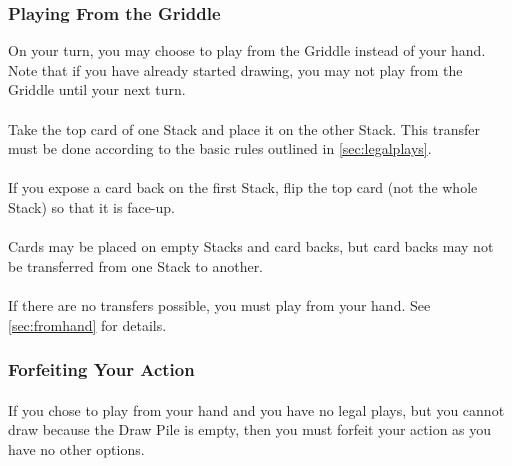 \documentclass{article}
\begin{document}
\subsubsection{Playing From the Griddle \label{sec:fromstack}}

On your turn, you may choose to play from the Griddle instead of your hand. Note that if you have already started drawing, you may not play from the Griddle until your next turn.

\paragraph{\label{par:transfer}}
Take the top card of one Stack and place it on the other Stack. This transfer must be done according to the basic rules outlined in \autoref{sec:legalplays}.

\paragraph{\label{par:expose}}
If you expose a card back on the first Stack, flip the top card (not the whole Stack) so that it is face-up.

\paragraph{\label{par:nocardbacktransfer}}
Cards may be placed on empty Stacks and card backs, but card backs may not be transferred from one Stack to another.

\paragraph{\label{par:notransferfallback}}
If there are no transfers possible, you must play from your hand. See \autoref{sec:fromhand} for details.

\subsubsection{Forfeiting Your Action \label{sec:forfeitaction}}

\paragraph{\label{par:forfeitactioncondition}}
If you chose to play from your hand and you have no legal plays, but you cannot draw because the Draw Pile is empty, then you must forfeit your action as you have no other options.
\end{document}

